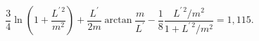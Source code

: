 \begin{equation}
\label{eq14}
\frac 34\ln\left(1 + \frac{L^{\prime\,2}}{m^2}\right) +
\frac{L^\prime}{2m}\arctan\frac m{L^\prime} -
\frac 18\frac{L^{\prime\,2}/m^2}
{1 + L^{\prime\,2}/m^2} = 1,115.
\end{equation}

